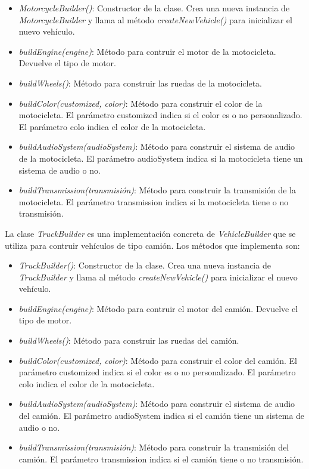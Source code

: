 \documentclass{article} %
\begin{document}
    \begin{itemize}
        \item \textit{MotorcycleBuilder()}: Constructor de la clase. Crea una nueva instancia de \textit{MotorcycleBuilder} y llama al método 
                \textit{createNewVehicle()} para inicializar el nuevo vehículo.
        \item \textit{buildEngine(engine)}: Método para contruir el motor de la motocicleta. Devuelve el tipo de motor.
        \item \textit{buildWheels()}: Método para construir las ruedas de la motocicleta.
        \item \textit{buildColor(customized, color)}: Método para construir el color de la motocicleta.
                El parámetro customized indica si el color es o no personalizado.
                El parámetro colo indica el color de la motocicleta.
        \item \textit{buildAudioSystem(audioSystem)}: Método para construir el sistema de audio de la motocicleta. 
                El parámetro audioSystem indica si la motocicleta tiene un sistema de audio o no.
        \item \textit{buildTransmission(transmisión)}: Método para construir la transmisión de la motocicleta. 
                El parámetro transmission indica si la motocicleta tiene o no transmisión.
    \end{itemize}

    \hspace*{1cm}La clase \textit{TruckBuilder} es una implementación concreta de \textit{VehicleBuilder} que se utiliza para contruir vehículos
    de tipo camión. Los métodos que implementa son:

    \begin{itemize}
        \item \textit{TruckBuilder()}: Constructor de la clase. Crea una nueva instancia de \textit{TruckBuilder} y llama al método 
                \textit{createNewVehicle()} para inicializar el nuevo vehículo.
        \item \textit{buildEngine(engine)}: Método para contruir el motor del camión. Devuelve el tipo de motor.
        \item \textit{buildWheels()}: Método para construir las ruedas del camión.
        \item \textit{buildColor(customized, color)}: Método para construir el color del camión.
                El parámetro customized indica si el color es o no personalizado.
                El parámetro colo indica el color de la motocicleta.
        \item \textit{buildAudioSystem(audioSystem)}: Método para construir el sistema de audio del camión. 
                El parámetro audioSystem indica si el camión tiene un sistema de audio o no.
        \item \textit{buildTransmission(transmisión)}: Método para construir la transmisión del camión. 
                El parámetro transmission indica si el camión tiene o no transmisión.
    \end{itemize}
\end{document}
